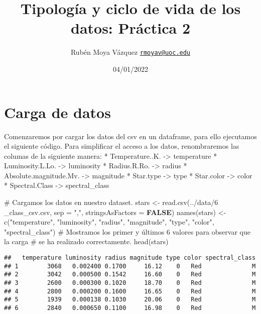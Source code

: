 \documentclass[
]{article}
\title{Tipología y ciclo de vida de los datos: Práctica 2}
\author{Rubén Moya Vázquez
\href{mailto:rmoyav@uoc.edu}{\nolinkurl{rmoyav@uoc.edu}}}
\date{04/01/2022}
\newenvironment{Shaded}{\begin{snugshade}}{\end{snugshade}}
\newcommand{\AttributeTok}[1]{\textcolor[rgb]{0.80,0.80,0.80}{#1}}
\newcommand{\CommentTok}[1]{\textcolor[rgb]{0.50,0.62,0.50}{#1}}
\newcommand{\ConstantTok}[1]{\textcolor[rgb]{0.86,0.64,0.64}{\textbf{#1}}}
\newcommand{\FunctionTok}[1]{\textcolor[rgb]{0.94,0.94,0.56}{#1}}
\newcommand{\NormalTok}[1]{\textcolor[rgb]{0.80,0.80,0.80}{#1}}
\newcommand{\OtherTok}[1]{\textcolor[rgb]{0.94,0.94,0.56}{#1}}
\newcommand{\StringTok}[1]{\textcolor[rgb]{0.80,0.58,0.58}{#1}}
\begin{document}
\maketitle

{
\setcounter{tocdepth}{2}
\tableofcontents
}
\hypertarget{carga-de-datos}{%
\section{Carga de datos}\label{carga-de-datos}}

Comenzaremos por cargar los datos del csv en un dataframe, para ello
ejecutamos el siguiente código. Para simplificar el acceso a los datos,
renombraremos las columas de la siguiente manera: * Temperature..K.
-\textgreater{} temperature * Luminosity.L.Lo. -\textgreater{}
luminosity * Radius.R.Ro. -\textgreater{} radius *
Absolute.magnitude.Mv. -\textgreater{} magnitude * Star.type
-\textgreater{} type * Star.color -\textgreater{} color * Spectral.Class
-\textgreater{} spectral\_class

\begin{Shaded}
\begin{Highlighting}[]
\CommentTok{\# Cargamos los datos en nuestro dataset.}
\NormalTok{stars }\OtherTok{\textless{}{-}} \FunctionTok{read.csv}\NormalTok{(}\StringTok{\textquotesingle{}../data/6 \_class\_csv.csv\textquotesingle{}}\NormalTok{, }\AttributeTok{sep =} \StringTok{","}\NormalTok{,  }\AttributeTok{stringsAsFactors =} \ConstantTok{FALSE}\NormalTok{)}
\FunctionTok{names}\NormalTok{(stars) }\OtherTok{\textless{}{-}} \FunctionTok{c}\NormalTok{(}\StringTok{"temperature"}\NormalTok{, }\StringTok{"luminosity"}\NormalTok{, }\StringTok{"radius"}\NormalTok{, }\StringTok{"magnitude"}\NormalTok{, }\StringTok{"type"}\NormalTok{, }\StringTok{"color"}\NormalTok{, }\StringTok{"spectral\_class"}\NormalTok{)}
\CommentTok{\# Mostramos los primer y últimos 6 valores para observar que la carga}
\CommentTok{\# se ha realizado correctamente.}
\FunctionTok{head}\NormalTok{(stars)}
\end{Highlighting}
\end{Shaded}

\begin{verbatim}
##   temperature luminosity radius magnitude type color spectral_class
## 1        3068   0.002400 0.1700     16.12    0   Red              M
## 2        3042   0.000500 0.1542     16.60    0   Red              M
## 3        2600   0.000300 0.1020     18.70    0   Red              M
## 4        2800   0.000200 0.1600     16.65    0   Red              M
## 5        1939   0.000138 0.1030     20.06    0   Red              M
## 6        2840   0.000650 0.1100     16.98    0   Red              M
\end{verbatim}
\end{document}
